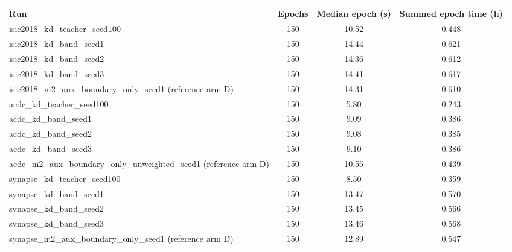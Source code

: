 \begin{tabular}{lccc}
\toprule
Run & Epochs & Median epoch (s) & Summed epoch time (h) \\
\midrule
isic2018\_kd\_teacher\_seed100 & 150 & 10.52 & 0.448 \\
isic2018\_kd\_band\_seed1 & 150 & 14.44 & 0.621 \\
isic2018\_kd\_band\_seed2 & 150 & 14.36 & 0.612 \\
isic2018\_kd\_band\_seed3 & 150 & 14.41 & 0.617 \\
isic2018\_m2\_aux\_boundary\_only\_seed1 (reference arm D) & 150 & 14.31 & 0.610 \\
acdc\_kd\_teacher\_seed100 & 150 & 5.80 & 0.243 \\
acdc\_kd\_band\_seed1 & 150 & 9.09 & 0.386 \\
acdc\_kd\_band\_seed2 & 150 & 9.08 & 0.385 \\
acdc\_kd\_band\_seed3 & 150 & 9.10 & 0.386 \\
acdc\_m2\_aux\_boundary\_only\_unweighted\_seed1 (reference arm D) & 150 & 10.55 & 0.439 \\
synapse\_kd\_teacher\_seed100 & 150 & 8.50 & 0.359 \\
synapse\_kd\_band\_seed1 & 150 & 13.47 & 0.570 \\
synapse\_kd\_band\_seed2 & 150 & 13.45 & 0.566 \\
synapse\_kd\_band\_seed3 & 150 & 13.46 & 0.568 \\
synapse\_m2\_aux\_boundary\_only\_seed1 (reference arm D) & 150 & 12.89 & 0.547 \\
\bottomrule
\end{tabular}
